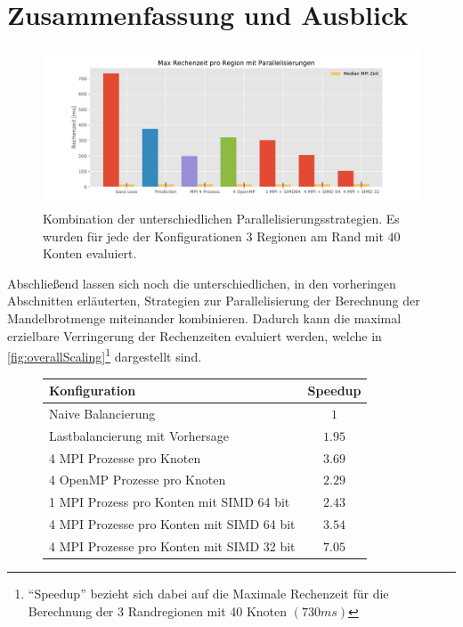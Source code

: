 \section{Zusammenfassung und Ausblick}

\begin{figure}
	\centering
	\includegraphics[width=0.9\linewidth]{img/Zusammenfassung/overall}
	\caption{Kombination der unterschiedlichen Parallelisierungsstrategien.
		Es wurden für jede der Konfigurationen \( 3 \) Regionen am Rand mit \( 40 \) Konten evaluiert.}
	\label{fig:overallScaling}
\end{figure}

Abschließend lassen sich noch die unterschiedlichen, in den vorheringen Abschnitten erläuterten,
Strategien zur Parallelisierung der Berechnung der Mandelbrotmenge miteinander kombinieren. Dadurch
kann die maximal erzielbare Verringerung der Rechenzeiten evaluiert werden, welche in \autoref{fig:overallScaling}\footnote{\enquote{Speedup} bezieht sich dabei auf
	die Maximale Rechenzeit für die Berechnung der 3 Randregionen mit 40 Knoten \( (730 ms) \)}
dargestellt sind.

\begin{figure}[h!]
	\centering
	\begin{tabular}{lc}
		Konfiguration                             & Speedup    \\
		\hline
		Naive Balancierung                        & \( 1 \)    \\
		Lastbalancierung mit Vorhersage           & \( 1.95 \) \\
		4 MPI Prozesse pro Knoten                 & \( 3.69 \) \\
		4 OpenMP Prozesse pro Knoten              & \( 2.29 \) \\
		1 MPI Prozess pro Konten mit SIMD 64 bit  & \( 2.43 \) \\
		4 MPI Prozesse pro Konten mit SIMD 64 bit & \( 3.54 \) \\
		4 MPI Prozesse pro Konten mit SIMD 32 bit & \( 7.05 \) \\
	\end{tabular}
\end{figure}

